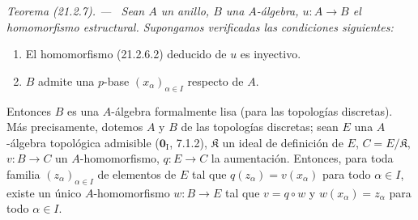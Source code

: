 \documentclass[10pt,oneside]{book}
\makeatletter
\newcommand{\setmanualcurrentlabel}[1]{\def\@currentlabel{#1}}
\newenvironment{theorem}[1][]{%
  \setmanualcurrentlabel{#1}\par\medskip\noindent\itshape Teorema (#1). ---\ }{\par}
\makeatother
\begin{document}
\begin{theorem}[21.2.7]
\label{0.21.2.7-es}
Sean $A$ un anillo, $B$ una $A$-álgebra, $u:A\to B$ el homomorfismo
estructural. Supongamos verificadas las condiciones siguientes:
\begin{enumerate}
  \item[\textup{(i)}] El homomorfismo \textup{(21.2.6.2)} deducido de $u$ es inyectivo.
  \item[\textup{(ii)}] $B$ admite una $p$-base $(x_\alpha)_{\alpha\in I}$ respecto de
  $A$.
\end{enumerate}
Entonces $B$ es una $A$-álgebra formalmente lisa (para las topologías
discretas). Más precisamente, dotemos $A$ y $B$ de las topologías discretas;
sean $E$ una $A$-álgebra topológica admisible \textup{($\mathbf 0_{\mathrm I}$, 7.1.2)},
$\mathfrak K$ un ideal de definición de $E$, $C=E/\mathfrak K$,
$v:B\to C$ un $A$-homomorfismo, $q:E\to C$ la aumentación. Entonces, para
toda familia $(z_\alpha)_{\alpha\in I}$ de elementos de $E$ tal que
$q(z_\alpha)=v(x_\alpha)$ para todo $\alpha\in I$, existe un único
$A$-homomorfismo $w:B\to E$ tal que $v=q\circ w$ y
$w(x_\alpha)=z_\alpha$ para todo $\alpha\in I$.
\end{theorem}
\end{document}
